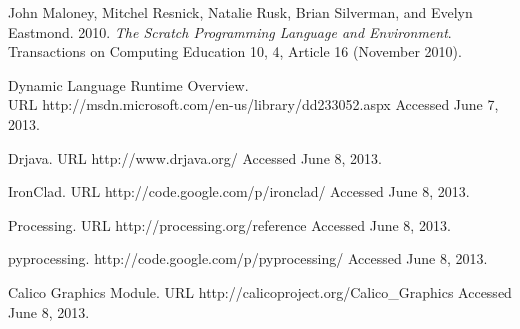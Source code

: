 \documentclass[preprint]{sigplanconf}
\begin{document}
\begin{thebibliography}{}
 John Maloney, Mitchel Resnick, Natalie Rusk, Brian
  Silverman, and Evelyn Eastmond. 2010. \textit{The Scratch Programming
  Language and Environment}. Transactions on Computing Education 10, 4,
  Article 16 (November 2010).

 Dynamic Language Runtime Overview. \\ URL
  http://msdn.microsoft.com/en-us/library/dd233052.aspx Accessed June
  7, 2013.

 Drjava. URL http://www.drjava.org/ Accessed June 8, 2013.

 IronClad. URL http://code.google.com/p/ironclad/
  Accessed June 8, 2013.

 Processing. URL http://processing.org/reference
  Accessed June 8, 2013.

  pyprocessing. http://code.google.com/p/pyprocessing/ Accessed June
  8, 2013.

 Calico Graphics Module. URL http://calicoproject.org/Calico\_Graphics Accessed June 8,
  2013.

\end{thebibliography}
\end{document}

